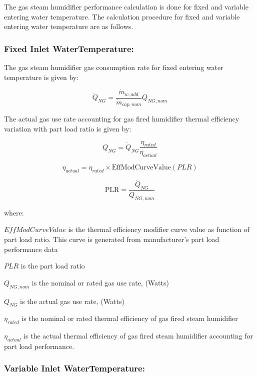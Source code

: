 The gas steam humidifier performance calculation is done for fixed and variable entering water temperature. The calculation procedure for fixed and variable entering water temperature are as follows.

\subsubsection{Fixed Inlet WaterTemperature:}\label{fixed-inlet-watertemperature}

The gas steam humidifier gas consumption rate for fixed entering water temperature is given by:

\begin{equation}
\dot{Q}_{NG} = \frac{\dot{m}_{w,add}}{\dot{m}_{cap,nom}}Q_{NG,nom}
\end{equation}

The actual gas use rate accounting for gas fired humidifier thermal efficiency variation with part load ratio is given by:

\begin{equation}
Q_{NG} = \dot{Q}_{NG}\frac{\eta_{rated}}{\eta_{actual}}
\end{equation}

\begin{equation}
\eta_{actual} = \eta_{rated} \times \mathrm{EffModCurveValue}\left(PLR\right)
\end{equation}

\begin{equation}
\mathrm{PLR} = \frac{\dot{Q}_{NG}}{Q_{NG,nom}}
\end{equation}

where:

\(EffModCurveValue\) is the thermal efficiency modifier curve value as function of part load ratio. This curve is generated from manufacturer's part load performance data

\(PLR\) is the part load ratio

\(Q_{NG,nom}\) is the nominal or rated gas use rate, (Watts)

\(Q_{NG}\) is the actual gas use rate, (Watts)

\({\eta_{rated}}\) is the nominal or rated thermal efficiency of gas fired steam humidifier

\({\eta_{actual}}\) is the actual thermal efficiency of gas fired steam humidifier accounting for part load performance.

\subsubsection{Variable Inlet WaterTemperature:}\label{variable-inlet-watertemperature}

